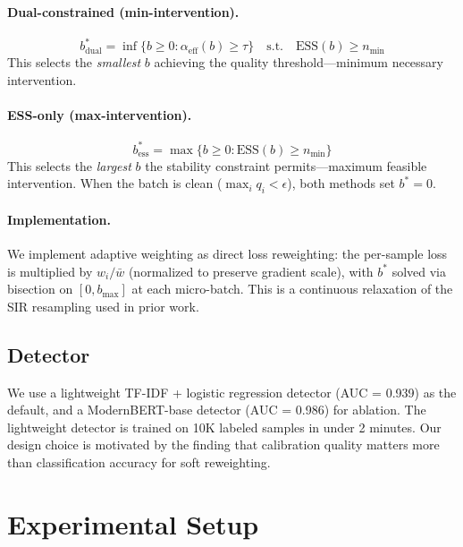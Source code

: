 \documentclass[11pt]{article}
\begin{document}
\paragraph{Dual-constrained (min-intervention).}
\begin{equation}
    b^*_{\mathrm{dual}} = \inf\{b \geq 0 : \alpha_{\mathrm{eff}}(b) \geq \tau\} \quad \text{s.t.} \quad \mathrm{ESS}(b) \geq n_{\min}
    \label{eq:dual}
\end{equation}
This selects the \emph{smallest} $b$ achieving the quality threshold---minimum necessary intervention.

\paragraph{ESS-only (max-intervention).}
\begin{equation}
    b^*_{\mathrm{ess}} = \max\{b \geq 0 : \mathrm{ESS}(b) \geq n_{\min}\}
    \label{eq:ess_only}
\end{equation}
This selects the \emph{largest} $b$ the stability constraint permits---maximum feasible intervention. When the batch is clean ($\max_i q_i < \epsilon$), both methods set $b^* = 0$.

\paragraph{Implementation.} We implement adaptive weighting as direct loss reweighting: the per-sample loss is multiplied by $w_i / \bar{w}$ (normalized to preserve gradient scale), with $b^*$ solved via bisection on $[0, b_{\max}]$ at each micro-batch. This is a continuous relaxation of the SIR resampling used in prior work.

\subsection{Detector}

We use a lightweight TF-IDF + logistic regression detector (AUC = 0.939) as the default, and a ModernBERT-base detector (AUC = 0.986) for ablation. The lightweight detector is trained on 10K labeled samples in under 2 minutes. Our design choice is motivated by the finding that calibration quality matters more than classification accuracy for soft reweighting.

\section{Experimental Setup}
\label{sec:setup}
\end{document}
